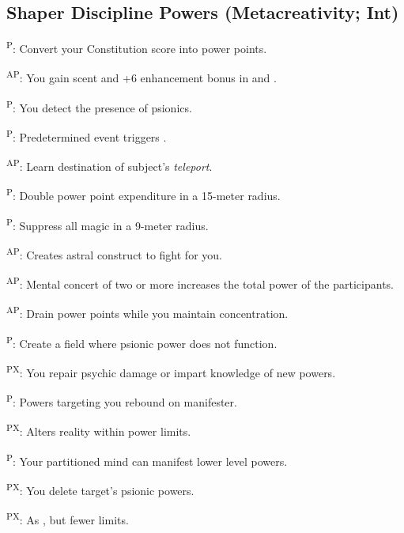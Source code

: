 \subsection{Shaper Discipline Powers {\normalsize(Metacreativity; Int)}}
\begin{enumerate*}
\item {}\textsuperscript{P}: Convert your Constitution score into power points.

      \textsuperscript{AP}: You gain scent and +6 enhancement bonus in  and .

\item {}\textsuperscript{P}: You detect the presence of psionics.

      \textsuperscript{P}: Predetermined event triggers .

\item {}\textsuperscript{AP}: Learn destination of subject's \emph{teleport}.

\item {}\textsuperscript{P}: Double power point expenditure in a 15-meter radius.

\item {}\textsuperscript{P}: Suppress all magic in a 9-meter radius.

      \textsuperscript{AP}: Creates astral construct to fight for you.

      \textsuperscript{AP}: Mental concert of two or more increases the total power of the participants.

      \textsuperscript{AP}: Drain power points while you maintain concentration.

\item {}\textsuperscript{P}: Create a field where psionic power does not function.

\item {}\textsuperscript{PX}: You repair psychic damage or impart knowledge of new powers.

      \textsuperscript{P}: Powers targeting you rebound on manifester.

\item {}\textsuperscript{PX}: Alters reality within power limits.

      \textsuperscript{P}: Your partitioned mind can manifest lower level powers.

\item {}\textsuperscript{PX}: You delete target's psionic powers.

      \textsuperscript{PX}: As , but fewer limits.
\end{enumerate*}



